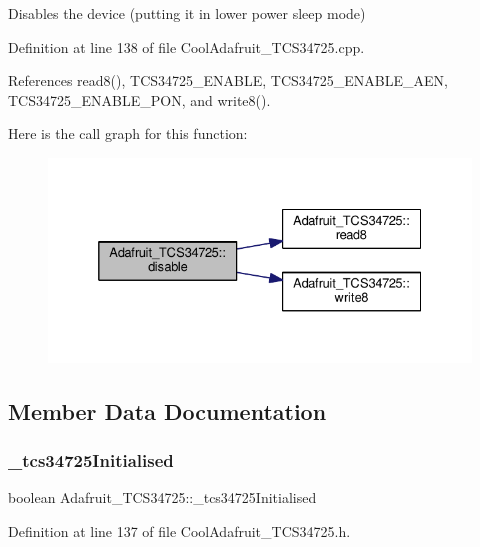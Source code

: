 Disables the device (putting it in lower power sleep mode) 

Definition at line 138 of file Cool\+Adafruit\+\_\+\+T\+C\+S34725.\+cpp.



References read8(), T\+C\+S34725\+\_\+\+E\+N\+A\+B\+LE, T\+C\+S34725\+\_\+\+E\+N\+A\+B\+L\+E\+\_\+\+A\+EN, T\+C\+S34725\+\_\+\+E\+N\+A\+B\+L\+E\+\_\+\+P\+ON, and write8().

Here is the call graph for this function\+:
\nopagebreak
\begin{figure}[H]
\begin{center}
\leavevmode
\includegraphics[width=332pt]{df/d54/class_adafruit___t_c_s34725_a79ac9b01a540f132d4bbf2edd2d6e8a2_cgraph}
\end{center}
\end{figure}


\subsection{Member Data Documentation}
\mbox{\label{class_adafruit___t_c_s34725_ae9368bc77b501044f034d5d9ad3266ba}} 
\subsubsection{\texorpdfstring{\+\_\+tcs34725\+Initialised}{\_tcs34725Initialised}}
{\footnotesize\ttfamily boolean Adafruit\+\_\+\+T\+C\+S34725\+::\+\_\+tcs34725\+Initialised\hspace{0.3cm}{\ttfamily [private]}}



Definition at line 137 of file Cool\+Adafruit\+\_\+\+T\+C\+S34725.\+h.



